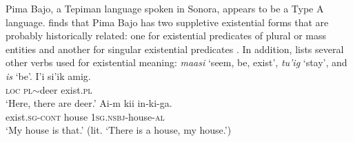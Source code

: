 \documentclass[output=paper]{langsci/langscibook}
\begin{document}
Pima Bajo, a Tepiman language spoken in Sonora, appears to be a Type A language. \citet[149]{estrada2014} finds that Pima Bajo has two suppletive existential forms that are probably historically related: one for existential predicates of plural or mass entities  and another for singular existential predicates . In addition, \citet[154]{estrada2014} lists several other verbs used for existential meaning: \emph{maasi} `seem, be, exist', \emph{tu'ig} `stay', and \emph{is} `be'. 
\ea
\label{ex:odam-pbdeer}
\gll	I’i 	si’ik 		amig.\\
\textsc{loc} 	\textsc{pl}$\sim$deer	exist.\textsc{pl}\\
\glt `Here, there are deer.’ \citep[149]{estrada2014}
\z
\ea
\label{ex:odam-pbhouse}
\gll	Ai-m 		kii 	in-ki-ga.\\
exist.\textsc{sg-cont}	house 	\textsc{1sg.nsbj}-house-\textsc{al}\\
\glt `My house is that.’ (lit. `There is a house, my house.’)
\citep[150]{estrada2014}
\z
\end{document}
